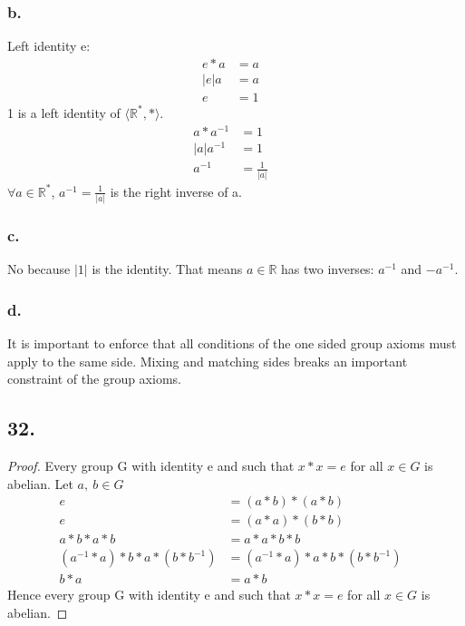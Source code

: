 \documentclass{article}
\begin{document}
\subsubsection*{b.}
	\begin{addmargin}[1em]{1em}
		Left identity e:
		\begin{align*}
			e * a &= a &\\
			|e|a &= a &\\
			e &= 1 &
		\end{align*}
		1 is a left identity of $\langle \mathbb{R}^*, *\rangle$.
		\begin{align*}
			a*a^{-1} &= 1 &\\
			|a|a^{-1} &= 1 &\\
			a^{-1} &= \frac{1}{|a|} &
		\end{align*}
		$\forall a \in \mathbb{R}^*$, $a^{-1} = \frac{1}{|a|}$ is the right inverse of a.
	\end{addmargin}

\subsubsection*{c.}
No because $|1|$ is the identity. That means $a \in \mathbb{R}$ has two inverses:
$a^{-1}$ and $-a^{-1}$.

\subsubsection*{d.}
It is important to enforce that all conditions of the one sided group axioms must
apply to the same side. Mixing and matching sides breaks an important constraint
of the group axioms.

\subsection*{32.}
	\begin{proof}Every group G with identity e and such that $x*x=e$ for all $x\in G$ is
	abelian. Let $a,\ b \in G$
		\begin{align*}
			e&=(a*b)*(a*b)&\\
			e&=(a*a)*(b*b)&\\
			a*b*a*b&=a*a*b*b&\\
			(a^{-1}*a)*b*a*(b*b^{-1})&=(a^{-1}*a)*a*b*(b*b^{-1})&\\
			b*a &= a*b &
		\end{align*}
	Hence every group G with identity e and such that $x*x=e$ for all $x\in G$ is
	abelian.
	\end{proof}
\end{document}
